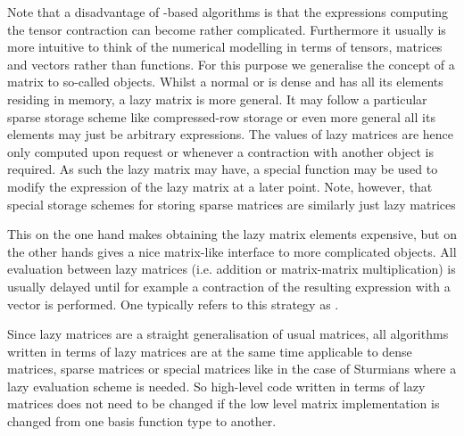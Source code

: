 Note that a disadvantage of \contraction-based algorithms is that the expressions
computing the tensor contraction can become rather complicated.
Furthermore it usually is more intuitive to think of the
numerical modelling in terms of tensors, matrices and vectors
rather than \contraction functions.
For this purpose we generalise the concept of a matrix
to so-called  objects.
Whilst a normal or  is dense and has all its elements
residing in memory,
a lazy matrix is more general.
It may follow a particular sparse storage scheme
like compressed-row storage
or even more general all its elements may just be arbitrary expressions.
The values of lazy matrices are hence only computed upon request
or whenever a contraction with another object is required.
As such the lazy matrix may have, \ie a special \update function
may be used to modify the expression of the lazy matrix
at a later point.
Note, however, that special storage schemes for storing
sparse matrices are similarly just lazy matrices 

This on the one hand makes obtaining the lazy matrix elements
expensive, but on the other hands gives a nice matrix-like
interface to more complicated objects.
All evaluation between lazy matrices
(i.e. addition or matrix-matrix multiplication)
is usually delayed until for example a contraction of the resulting
expression with a vector is performed.
One typically refers to this strategy as .

Since lazy matrices are a straight generalisation
of usual matrices,
all algorithms written in terms of lazy matrices
are at the same time applicable to dense matrices,
sparse matrices or special matrices like in the case of Sturmians
where a lazy evaluation scheme is needed.
So high-level code written in terms of lazy matrices
does not need to be changed if the low level matrix implementation
is changed from one basis function type to another.


%



